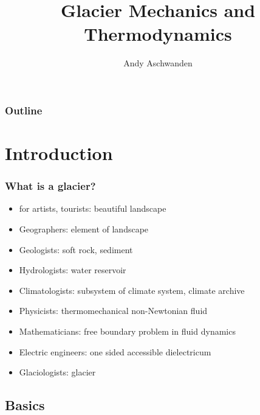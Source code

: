 \documentclass[notes=hide]{beamer}
\title[Glacier Dynamics] %
{Glacier Mechanics and Thermodynamics}
\author[Aschwanden] %
{Andy Aschwanden}
\institute[ARSC] %
{
  Arctic Region Supercomputing Center\\
  University of Alaska Fairbanks, USA
}
\begin{document}
\begin{frame}
  \titlepage
\end{frame}

\begin{frame}
 \frametitle{Outline}
 \tableofcontents[subsectionstyle=hide]
\end{frame}



\section{Introduction}



\begin{frame}
  \frametitle{What is a glacier?}
  \begin{itemize}[<+- | alert@+>] %
    \item for artists, tourists: beautiful landscape
    \item Geographers: element of landscape
    \item Geologists: soft rock, sediment
    \item Hydrologists: water reservoir
    \item Climatologists: subsystem of climate system, climate archive
    \item Physicists: thermomechanical non-Newtonian fluid
    \item Mathematicians: free boundary problem in fluid dynamics
    \item Electric engineers: one sided accessible dielectricum
    \item Glaciologists: glacier
  \end{itemize} 
\end{frame}

\subsection{Basics}
\end{document}
